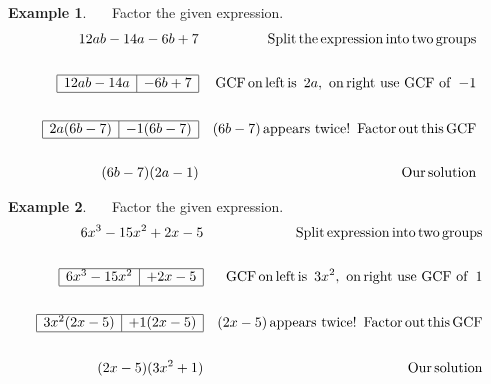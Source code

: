 \documentclass[12pt]{book}
\theoremstyle{definition}
\newtheorem{example}{Example}
\newcommand{\tmop}[1]{\ensuremath{\operatorname{#1}}}
\begin{document}
\begin{example}~~~Factor the given expression.
  \begin{eqnarray*}
    12 a b - 14 a - 6 b + 7 &  & \tmop{Split} \tmop{the} \tmop{expression}
    \tmop{into} \tmop{two} \tmop{groups}\\
   &&\\
		\begin{array}{|l|l|}
      \hline
      12 ab - 14 a & - 6 b + 7\\
      \hline
    \end{array} &  & \tmop{GCF} \tmop{on} \tmop{left} \tmop{is~} 2 a, \tmop{~on}
    \tmop{right~use~GCF~of~} - 1\\
   &&\\
	  \begin{array}{|l|l|}
      \hline
      2 a (6 b - 7) & - 1 (6 b - 7)\\
      \hline
    \end{array} &  & (6 b - 7) \tmop{appears~twice} !
    \tmop{~Factor} \tmop{out} \tmop{this} \tmop{GCF}\\
   &&\\
	  (6 b - 7) (2 a - 1) &  & \tmop{Our} \tmop{solution}
  \end{eqnarray*}
\end{example}

\begin{example}~~~Factor the given expression.
  \begin{eqnarray*}
    6 x^3 - 15 x^2 + 2 x - 5 &  & \tmop{Split} \tmop{expression} \tmop{into}
    \tmop{two} \tmop{groups}\\
   &&\\
	  \begin{array}{|l|l|}
      \hline
      6 x^3 - 15 x^2 & + 2 x - 5\\
      \hline
    \end{array} &  & \tmop{GCF} \tmop{on} \tmop{left} \tmop{is~} 3 x^2,
    \tmop{~on} \tmop{right~use~GCF~of~} 1\\
   &&\\
	  \begin{array}{|l|l|}
      \hline
      3 x^2 (2 x - 5) & + 1 (2 x - 5)\\
      \hline
    \end{array} &  & (2 x - 5) \tmop{appears~twice} !
    \tmop{~Factor} \tmop{out} \tmop{this} \tmop{GCF}\\
   &&\\
	  (2 x - 5) (3 x^2 + 1) &  & \tmop{Our} \tmop{solution}
  \end{eqnarray*}
\end{example}
\end{document}
